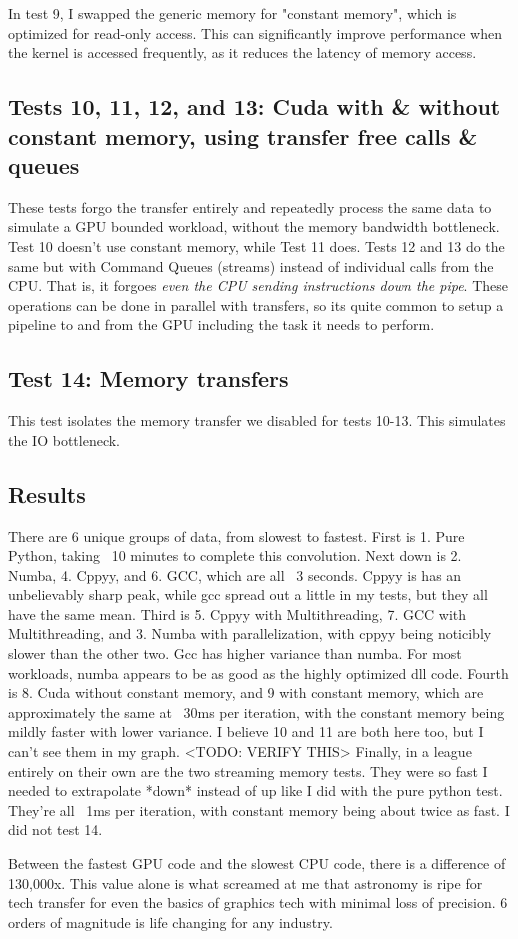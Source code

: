\documentclass[%
 reprint,
 amsmath,amssymb,
 aps,
showkeys,
]{revtex4-2}
\begin{document}
In test 9, I swapped the generic memory for "constant memory", which is optimized for read-only access. This can significantly improve performance when the kernel is accessed frequently, as it reduces the latency of memory access.

\subsection{Tests 10, 11, 12, and 13: Cuda with & without constant memory, using transfer free calls & queues}
These tests forgo the transfer entirely and repeatedly process the same data to simulate a GPU bounded workload, without the memory bandwidth bottleneck. Test 10 doesn't use constant memory, while Test 11 does. Tests 12 and 13 do the same but with Command Queues (streams) instead of individual calls from the CPU. That is, it forgoes \textit{even the CPU sending instructions down the pipe}. These operations can be done in parallel with transfers, so its quite common to setup a pipeline to and from the GPU including the task it needs to perform.

\subsection{Test 14: Memory transfers}
This test isolates the memory transfer we disabled for tests 10-13. This simulates the IO bottleneck.

\subsection{Results}
There are 6 unique groups of data, from slowest to fastest.
First is 1. Pure Python, taking ~10 minutes to complete this convolution.
Next down is 2. Numba, 4. Cppyy, and 6. GCC, which are all ~3 seconds. Cppyy is has an unbelievably sharp peak, while gcc spread out a little in my tests, but they all have the same mean.
Third is 5. Cppyy with Multithreading, 7. GCC with Multithreading, and 3. Numba with parallelization, with cppyy being noticibly slower than the other two. Gcc has higher variance than numba. For most workloads, numba appears to be as good as the highly optimized dll code.
Fourth is 8. Cuda without constant memory, and 9 with constant memory, which are approximately the same at ~30ms per iteration, with the constant memory being mildly faster with lower variance. I believe 10 and 11 are both here too, but I can't see them in my graph. <TODO: VERIFY THIS>
Finally, in a league entirely on their own are the two streaming memory tests. They were so fast I needed to extrapolate *down* instead of up like I did with the pure python test. They're all ~1ms per iteration, with constant memory being about twice as fast. 
I did not test 14.

Between the fastest GPU code and the slowest CPU code, there is a difference of 130,000x. This value alone is what screamed at me that astronomy is ripe for tech transfer for even the basics of graphics tech with minimal loss of precision. 6 orders of magnitude is life changing for any industry.
\end{document}
